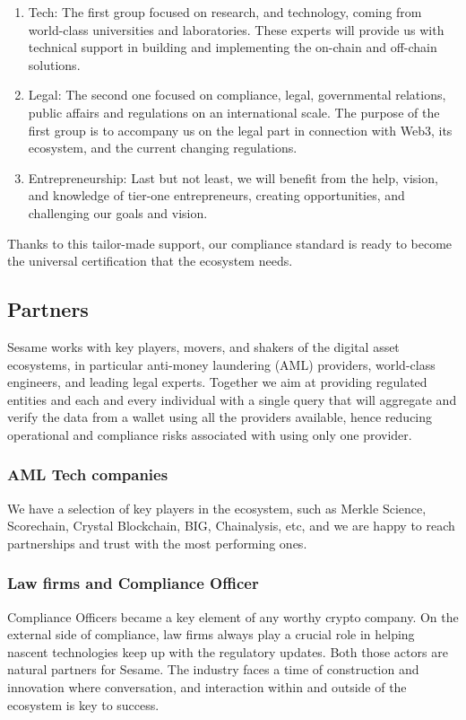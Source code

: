 ﻿\documentclass[a4paper]{article}
\begin{document}
\begin{enumerate}
\item Tech: The first group focused on research, and technology, coming from world-class universities and laboratories. These experts will provide us with technical support in building and implementing the on-chain and off-chain solutions.

\item Legal: The second one focused on compliance, legal, governmental relations, public affairs and regulations on an international scale. The purpose of the first group is to accompany us on the legal part in connection with Web3, its ecosystem, and the current changing regulations.

\item Entrepreneurship: Last but not least, we will benefit from the help, vision, and knowledge of tier-one entrepreneurs, creating opportunities, and challenging our goals and vision.
\end{enumerate}

Thanks to this tailor-made support, our compliance standard is ready to become the universal certification that the ecosystem needs.

\subsection{Partners}
Sesame works with key players, movers, and shakers of the digital asset ecosystems, in particular anti-money laundering (AML) providers, world-class engineers, and leading legal experts. Together we aim at providing regulated entities and each and every individual with a single query that will aggregate and verify the data from a wallet using all the providers available, hence reducing operational and compliance risks associated with using only one provider.

\subsubsection{AML Tech companies}
We have a selection of key players in the ecosystem, such as Merkle Science, Scorechain, Crystal Blockchain, BIG, Chainalysis, etc, and we are happy to reach partnerships and trust with the most performing ones.

\subsubsection{Law firms and Compliance Officer}
Compliance Officers became a key element of any worthy crypto company. On the external side of compliance, law firms always play a crucial role in helping nascent technologies keep up with the regulatory updates. Both those actors are natural partners for Sesame. The industry faces a time of construction and innovation where conversation, and interaction within and outside of the ecosystem is key to success.
\end{document}
